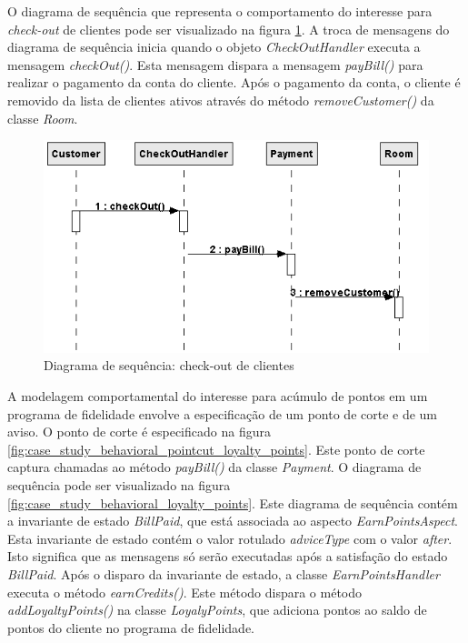 O diagrama de sequência que representa o comportamento do interesse para \textit{check-out} de clientes pode ser visualizado na figura
\ref{fig:case_study_behavioral_check_out}. A troca de mensagens do diagrama de sequência inicia quando o objeto \textit{CheckOutHandler} executa a
mensagem \textit{checkOut()}. Esta mensagem dispara a mensagem \textit{payBill()} para realizar o pagamento da conta do cliente. Após o pagamento da
conta, o cliente é removido da lista de clientes ativos através do método \textit{removeCustomer()} da classe \textit{Room}.

  \begin{figure}
	\centering
	\includegraphics{img/case_study_behavioral_check_out.png}
	\caption{Diagrama de sequência: check-out de clientes}\label{fig:case_study_behavioral_check_out}
  \end{figure}
  
A modelagem comportamental do interesse para acúmulo de pontos em um programa de fidelidade envolve a especificação de um ponto de corte e de um
aviso. O ponto de corte é especificado na figura \ref{fig:case_study_behavioral_pointcut_loyalty_points}. Este ponto de corte captura chamadas ao
método \textit{payBill()} da classe \textit{Payment}. O diagrama de sequência pode ser visualizado na figura
\ref{fig:case_study_behavioral_loyalty_points}. Este diagrama de sequência contém a invariante de estado \textit{BillPaid}, que está associada ao
aspecto \textit{EarnPointsAspect}. Esta invariante de estado contém o valor rotulado \textit{adviceType} com o valor \textit{after}. Isto significa que as
mensagens só serão executadas após a satisfação do estado \textit{BillPaid}. Após o disparo da invariante de estado, a classe
\textit{EarnPointsHandler} executa o método \textit{earnCredits()}. Este método dispara o método \textit{addLoyaltyPoints()} na classe
\textit{LoyalyPoints}, que adiciona pontos ao saldo de pontos do cliente no programa de fidelidade.
  

